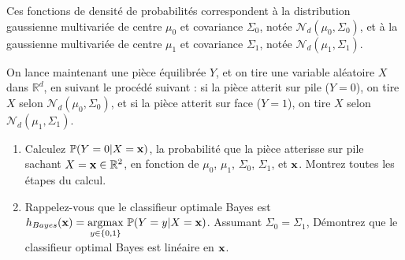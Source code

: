 \documentclass[11pt,french,english]{article}
\begin{document}
\begin{enumerate}
{Ces fonctions de densité de probabilités correspondent à la distribution gaussienne multivariée de centre $\mu_0$ et covariance $\Sigma_0$, notée $\mathcal{N}_{d}(\mu_{0},\Sigma_{0})$, et à la gaussienne multivariée de centre $\mu_{1}$ et covariance $\Sigma_{1}$, notée $\mathcal{N}_{d}(\mu_{1},\Sigma_{1})$.}

{On lance maintenant une pièce équilibrée $Y$, et on tire une variable aléatoire $X$ dans $\mathbb{R}^{d}$, en suivant le procédé suivant : si la pièce atterit sur pile ($Y=0$), on tire $X$ selon $\mathcal{N}_{d}(\mu_{0},\Sigma_{0})$, et si la pièce atterit sur face ($Y=1$), on tire $X$ selon $\mathcal{N}_{d}(\mu_{1},\Sigma_{1})$. }

\begin{enumerate}
\item {}
{Calculez $\mathbb{P}(Y=0|X=\mathbf{x})$, la probabilité que la pièce atterisse sur pile sachant $X=\mathbf{x}\in\mathbb{R}^{2}$, en fonction de $\mu_{0}$, $\mu_{1}$, $\Sigma_{0}$, $\Sigma_{1}$, et $\mathbf{x}$.
Montrez toutes les étapes du calcul.}

\item {}%
{Rappelez-vous que le classifieur optimale Bayes est $h_{Bayes}(\mathbf{x}) = \underset{y \in \{0,1\}}{\mathrm{argmax}}\ \mathbb{P}(Y=y|X=\mathbf{x})$. Assumant $\Sigma_0 = \Sigma_1$, Démontrez que le classifieur optimal Bayes est linéaire en $\mathbf{x}$. }
\end{enumerate}


\end{enumerate}
\end{document}
